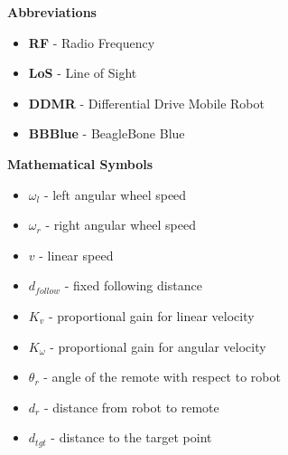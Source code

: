 
\renewcommand{\nomname}{Nomenclature}
\renewcommand{\nomAname}{\textbf{\large Abbreviations}}
\renewcommand{\nomGname}{\textbf{\large Mathematical Symbols}}
\renewcommand{\nomXname}{\textbf{\large Superscripts}}
\renewcommand{\nomZname}{\textbf{\large Subscripts}}

\printnomenclature
\cleardoublepage
{} %


\nomAname
\begin{itemize}
    \item[]\textbf{RF} - Radio Frequency
    \item[]\textbf{LoS} - Line of Sight
    \item[]\textbf{DDMR} - Differential Drive Mobile Robot
    \item[]\textbf{BBBlue} - BeagleBone Blue
      
\end{itemize}
\bigbreak

\nomGname
\begin{itemize}
	\item[]$\omega_l$ - left angular wheel speed
	\item[]$\omega_r$ - right angular wheel speed
	\item[]$v$ - linear speed
	\item[]$d_{follow}$ - fixed following distance 
    \item[]$K_v$ - proportional gain for linear velocity
    \item[]$K_\omega$ - proportional gain for angular velocity
    \item[]$\theta_r$ - angle of the remote with respect to robot
    \item[]$d_r$ - distance from robot to remote
    \item[]$d_{tgt}$ - distance to the target point

\end{itemize}



